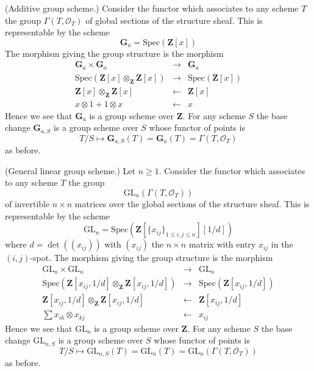 \begin{example}
\label{example-additive-group}
(Additive group scheme.)
Consider the functor which associates
to any scheme $T$ the group $\Gamma(T, \mathcal{O}_T)$
of global sections of the structure sheaf.
This is representable by the scheme
$$
\mathbf{G}_a = \text{Spec}(\mathbf{Z}[x])
$$
The morphism giving the group structure is the morphism
\begin{eqnarray*}
\mathbf{G}_a \times \mathbf{G}_a & \to & \mathbf{G}_a \\
\text{Spec}(\mathbf{Z}[x] \otimes_{\mathbf{Z}} \mathbf{Z}[x])
& \to &
\text{Spec}(\mathbf{Z}[x]) \\
\mathbf{Z}[x] \otimes_{\mathbf{Z}} \mathbf{Z}[x]
& \leftarrow &
\mathbf{Z}[x] \\
x \otimes 1 + 1 \otimes x & \leftarrow & x
\end{eqnarray*}
Hence we see that $\mathbf{G}_a$ is a group scheme over $\mathbf{Z}$.
For any scheme $S$ the base change $\mathbf{G}_{a, S}$ is a
group scheme over $S$ whose functor of points is
$$
T/S
\longmapsto
\mathbf{G}_{a, S}(T) = \mathbf{G}_a(T) = \Gamma(T, \mathcal{O}_T)
$$
as before.
\end{example}

\begin{example}
\label{example-general-linear-group}
(General linear group scheme.)
Let $n \geq 1$.
Consider the functor which associates
to any scheme $T$ the group
$$
\text{GL}_n(\Gamma(T, \mathcal{O}_T))
$$
of invertible $n \times n$ matrices over
the global sections of the structure sheaf.
This is representable by the scheme
$$
\text{GL}_n = \text{Spec}(\mathbf{Z}[\{x_{ij}\}_{1 \leq i, j \leq n}][1/d])
$$
where $d = \det((x_{ij}))$ with $(x_{ij})$ the $n \times n$ matrix
with entry $x_{ij}$ in the $(i, j)$-spot.
The morphism giving the group structure is the morphism
\begin{eqnarray*}
\text{GL}_n \times \text{GL}_n & \to & \text{GL}_n \\
\text{Spec}(\mathbf{Z}[x_{ij}, 1/d] \otimes_{\mathbf{Z}}
\mathbf{Z}[x_{ij}, 1/d])
& \to &
\text{Spec}(\mathbf{Z}[x_{ij}, 1/d]) \\
\mathbf{Z}[x_{ij}, 1/d] \otimes_{\mathbf{Z}} \mathbf{Z}[x_{ij}, 1/d]
& \leftarrow &
\mathbf{Z}[x_{ij}, 1/d] \\
\sum x_{ik} \otimes x_{kj} & \leftarrow & x_{ij}
\end{eqnarray*}
Hence we see that $\text{GL}_n$ is a group scheme over $\mathbf{Z}$.
For any scheme $S$ the base change $\text{GL}_{n, S}$ is a
group scheme over $S$ whose functor of points is
$$
T/S
\longmapsto
\text{GL}_{n, S}(T) = \text{GL}_n(T) =\text{GL}_n(\Gamma(T, \mathcal{O}_T))
$$
as before.
\end{example}

